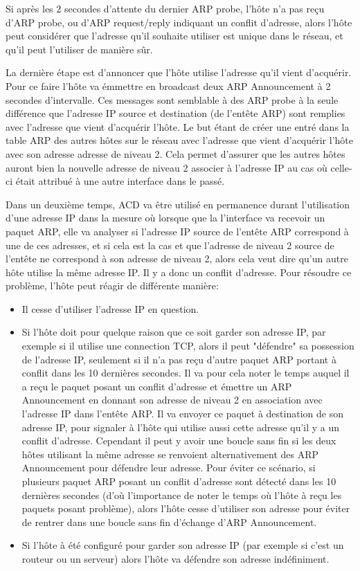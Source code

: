Si après les 2 secondes d'attente du dernier ARP probe, l'hôte n'a pas reçu
d'ARP probe, ou d'ARP request/reply indiquant un conflit d'adresse, alors
l'hôte peut considérer que l'adresse qu'il souhaite utiliser est unique dans le
réseau, et qu'il peut l'utiliser de manière sûr.

La dernière étape est d'annoncer que l'hôte utilise l'adresse qu'il vient
d'acquérir.  Pour ce faire l'hôte va émmettre en broadcast deux ARP
Announcement à 2 secondes d'intervalle.  Ces messages sont semblable à des ARP
probe à la seule différence que l'adresse IP source et destination (de l'entête
ARP) sont remplies avec l'adresse que vient d'acquérir l'hôte.  Le but étant de
créer une entré dans la table ARP des autres hôtes sur le réseau avec l'adresse
que vient d'acquérir l'hôte avec son adresse adresse de niveau 2. Cela permet
d'assurer que les autres hôtes auront bien la nouvelle adresse de niveau 2
associer à l'adresse IP au cas où celle-ci était attribué à une autre interface
dans le passé.


Dans un deuxième temps, ACD va être utilisé en permanence durant l'utilisation
d'une adresse IP dans la mesure où lorsque que la l'interface va recevoir un
paquet ARP, elle va analyser si l'adresse IP source de l'entête ARP correspond
à une de ces adresses, et si cela est la cas et que l'adresse de niveau 2
source de l'entête ne correspond à son adresse de niveau 2, alors cela veut
dire qu'un autre hôte utilise la même adresse IP. Il y a donc un conflit
d'adresse.  Pour résoudre ce problème, l'hôte peut réagir de différente
manière:
\begin{itemize}
\item Il cesse d'utiliser l'adresse IP en question.
\item Si l'hôte doit pour quelque raison que ce soit garder son adresse IP, par
exemple si il utilise une connection TCP, alors il peut "défendre" sa
possession de l'adresse IP, seulement si il n'a pas reçu d'autre paquet ARP
portant à conflit dans les 10 dernières secondes.  Il va pour cela noter le
temps auquel il a reçu le paquet posant un conflit d'adresse et émettre un ARP
Announcement en donnant son adresse de niveau 2 en association avec l'adresse
IP dans l'entête ARP. Il va envoyer ce paquet à destination de son adresse IP,
pour signaler à l'hôte qui utilise aussi cette adresse qu'il y a un conflit
d'adresse. Cependant il peut y avoir une boucle sans fin si les deux hôtes
utilisant la même adresse se renvoient alternativement des ARP Announcement
pour défendre leur adresse. Pour éviter ce scénario, si plusieurs paquet ARP
posant un conflit d'adresse sont détecté dans les 10 dernières secondes (d'où
l'importance de noter le temps où l'hôte à reçu les paquets posant problème),
alors l'hôte cesse d'utiliser son adresse pour éviter de rentrer dans une
boucle sans fin d'échange d'ARP Announcement.
\item Si l'hôte à été configuré pour garder son adresse IP (par exemple si
c'est un routeur ou un serveur) alors l'hôte va défendre son adresse
indéfiniment.
\end{itemize}


